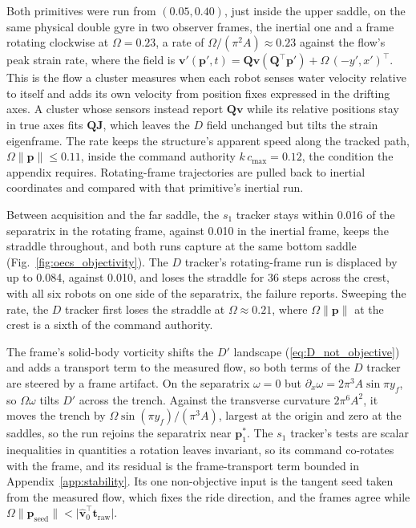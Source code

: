 \documentclass[lettersize,journal]{IEEEtran}
\begin{document}
Both primitives were run from $(0.05, 0.40)$, just inside the upper
saddle, on the same physical double gyre in two observer
frames, the inertial one and a frame rotating clockwise at $\Omega = 0.23$, a rate of
$\Omega/(\pi^2 A) \approx 0.23$ against the flow's peak strain rate,
where the field is $\mathbf{v}'(\mathbf{p}', t) =
\mathbf{Q}\mathbf{v}(\mathbf{Q}^\top \mathbf{p}') + \Omega\,(-y',
x')^\top$. This is the flow a cluster measures when each robot senses
water velocity relative to itself and adds its own velocity from position
fixes expressed in the drifting axes. A cluster whose sensors instead
report $\mathbf{Q}\mathbf{v}$ while its relative positions stay in true
axes fits $\mathbf{Q}\mathbf{J}$, which leaves the $D$ field unchanged but
tilts the strain eigenframe. The rate keeps the structure's apparent speed
along the tracked path, $\Omega\lVert\mathbf{p}\rVert \leq 0.11$, inside the command
authority $k\,c_{\max} = 0.12$, the condition the appendix requires.
Rotating-frame trajectories are pulled back to inertial coordinates and
compared with that primitive's inertial run.

Between acquisition and the far saddle, the $s_1$ tracker stays within
0.016 of the separatrix in the rotating frame, against 0.010 in the
inertial frame, keeps the straddle throughout, and both runs capture at
the same bottom saddle (Fig.~\ref{fig:oecs_objectivity}). The $D$
tracker's rotating-frame run is displaced by up to 0.084, against 0.010,
and loses the straddle for 36 steps across the crest, with all six
robots on one side of the separatrix, the failure \cite{26} reports.
Sweeping the rate, the $D$ tracker first loses the straddle at
$\Omega \approx 0.21$, where $\Omega\lVert\mathbf{p}\rVert$ at the crest
is a sixth of the command authority.

The frame's solid-body vorticity shifts the $D'$ landscape
(\ref{eq:D_not_objective}) and adds a transport term to the measured flow,
so both terms of the $D$ tracker are steered by a frame artifact.
On the separatrix $\omega = 0$ but
$\partial_x\omega = 2\pi^3 A\sin\pi y_f$, so $\Omega\omega$ tilts $D'$
across the trench. Against the transverse curvature $2\pi^6 A^2$, it moves
the trench by $\Omega\sin(\pi y_f)/(\pi^3 A)$, largest at the origin and
zero at the saddles, so the run rejoins the separatrix near
$\mathbf{p}_1^*$. The $s_1$ tracker's tests are scalar inequalities in quantities a
rotation leaves invariant, so its command co-rotates with the frame, and
its residual is the frame-transport term bounded in
Appendix~\ref{app:stability}. Its one non-objective input is the tangent
seed taken from the measured flow, which fixes the ride direction, and
the frames agree while
$\Omega\lVert\mathbf{p}_{\text{seed}}\rVert <
\lvert\hat{\mathbf{v}}_0^\top\mathbf{t}_{\text{raw}}\rvert$.
\end{document}
